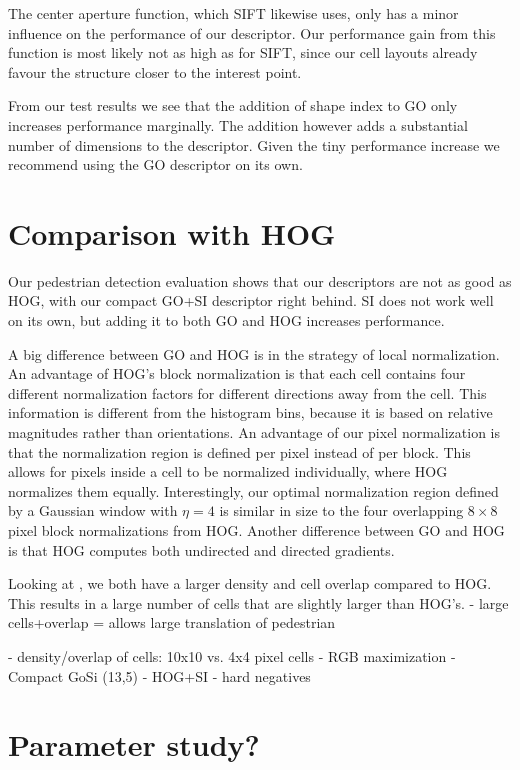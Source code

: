 \documentclass[thesis.tex]{subfiles}
\begin{document}
The center aperture function, which SIFT likewise uses, only has a minor influence on the performance of our descriptor. Our performance gain from this function is most likely not as high as for SIFT, since our cell layouts already favour the structure closer to the interest point.

From our test results we see that the addition of shape index to GO only increases performance marginally. The addition however adds a substantial number of dimensions to the descriptor.
Given the tiny performance increase we recommend using the GO descriptor on its own.

\section{Comparison with HOG}

Our pedestrian detection evaluation shows that our descriptors are not as good as HOG, with our compact GO+SI descriptor right behind. SI does not work well on its own, but adding it to both GO and HOG increases performance.

A big difference between GO and HOG is in the strategy of local normalization. An advantage of HOG's block normalization is that each cell contains four different normalization factors for different directions away from the cell. This information is different from the histogram bins, because it is based on relative magnitudes rather than orientations. An advantage of our pixel normalization is that the normalization region is defined per pixel instead of per block. This allows for pixels inside a cell to be normalized individually, where HOG normalizes them equally. Interestingly, our optimal normalization region defined by a Gaussian window with $\eta = 4$ is similar in size to the four overlapping $8 \times 8$ pixel block normalizations from HOG. Another difference between GO and HOG is that HOG computes both undirected and directed gradients.

Looking at , we both have a larger density and cell overlap compared to HOG. This results in a large number of cells that are slightly larger than HOG's.
- large cells+overlap = allows large translation of pedestrian

- density/overlap of cells: 10x10 vs. 4x4 pixel cells
- RGB maximization
- Compact GoSi (13,5)
- HOG+SI
- hard negatives

\section{Parameter study?}
\end{document}
